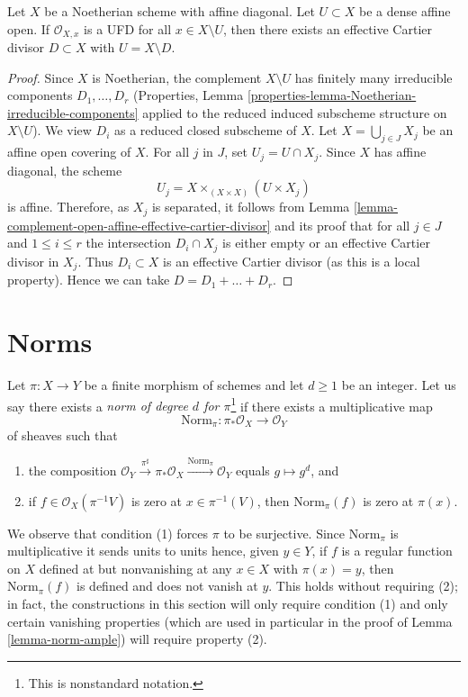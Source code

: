 \begin{lemma}
\label{lemma-generalization-of-complement-open-affine-effective-cartier-divisor}
Let $X$ be a Noetherian scheme with affine diagonal. Let $U \subset X$ be
a dense affine open. If $\mathcal{O}_{X, x}$ is a UFD for all
$x \in X \setminus U$, then there exists an effective Cartier
divisor $D \subset X$ with $U = X \setminus D$.
\end{lemma}

\begin{proof}
Since $X$ is Noetherian, the complement $X \setminus U$ has finitely
many irreducible components $D_1, \ldots, D_r$
(Properties, Lemma \ref{properties-lemma-Noetherian-irreducible-components}
applied to the reduced induced subscheme structure on $X \setminus U$).
We view $D_i$ as a reduced closed subscheme of $X$.
Let $X = \bigcup_{j \in J} X_j$ be an affine open covering of $X$. For all
$j$ in $J$, set $U_j = U \cap X_j$. Since $X$ has affine diagonal,
the scheme
$$
U_j = X \times_{(X \times X)} (U \times X_j)
$$
is affine. Therefore, as $X_j$ is separated, it follows from
Lemma \ref{lemma-complement-open-affine-effective-cartier-divisor}
and its proof that for all $j \in J$ and $1 \leq i \leq r$ the
intersection $D_i \cap X_j$ is either empty or an
effective Cartier divisor in $X_j$.
Thus $D_i \subset X$ is an effective Cartier divisor (as this is
a local property). Hence we can take $D = D_1 + \ldots + D_r$.
\end{proof}




\section{Norms}
\label{section-norms}

\noindent
Let $\pi : X \to Y$ be a finite morphism of schemes and let $d \geq 1$
be an integer. Let us say there exists a
{\it norm of degree $d$ for $\pi$}\footnote{This is nonstandard
notation.} if there exists a multiplicative map
$$
\text{Norm}_\pi : \pi_*\mathcal{O}_X \to \mathcal{O}_Y
$$
of sheaves such that
\begin{enumerate}
\item the composition
$\mathcal{O}_Y \xrightarrow{\pi^\sharp} \pi_*\mathcal{O}_X
\xrightarrow{\text{Norm}_\pi} \mathcal{O}_Y$ equals $g \mapsto g^d$, and
\item if $f \in \mathcal{O}_X(\pi^{-1}V)$
is zero at $x \in \pi^{-1}(V)$, then $\text{Norm}_\pi(f)$
is zero at $\pi(x)$.
\end{enumerate}
We observe that condition (1) forces $\pi$ to be surjective.
Since $\text{Norm}_\pi$ is multiplicative it sends units to units
hence, given $y \in Y$, if $f$ is a regular function on $X$
defined at but nonvanishing at any $x \in X$
with $\pi(x) = y$, then $\text{Norm}_\pi(f)$ is defined
and does not vanish at $y$. This holds without requiring (2);
in fact, the constructions in this section will only require condition (1)
and only certain vanishing properties (which are used in particular
in the proof of Lemma \ref{lemma-norm-ample}) will require property (2).

